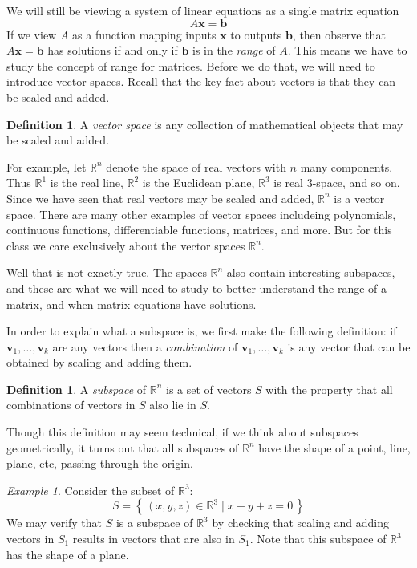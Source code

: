 \documentclass[11pt,oneside]{amsbook}
\newcommand{\set}[1]{\left\{\,#1\,\right\}}
\newcommand{\R}{\mathbb R}
\theoremstyle{definition}
\theoremstyle{plain}
\theoremstyle{definition}
\newtheorem{definition}[theorem]{Definition}
\theoremstyle{remark}
\newtheorem{example}[theorem]{Example}
\numberwithin{equation}{section}
\numberwithin{figure}{section}
\begin{document}
We will still be viewing a system of linear equations as a single matrix equation
\[A\mathbf{x}=\mathbf{b}
\]
If we view $A$ as a function mapping inputs $\mathbf{x}$ to outputs $\mathbf{b}$, then observe that $A\mathbf{x}=\mathbf{b}$ has solutions if and only if $\mathbf{b}$ is in the \emph{range} of $A$. This means we have to study the concept of range for matrices. Before we do that, we will need to introduce vector spaces. Recall that the key fact about vectors is that they can be scaled and added.

\begin{definition}
  A \emph{vector space} is any collection of mathematical objects that may be scaled and added.
\end{definition}

For example, let $\R^n$ denote the space of real vectors with $n$ many components. Thus $\R^1$ is the real line, $\R^2$ is the Euclidean plane, $\R^3$ is real $3$-space, and so on. Since we have seen that real vectors may be scaled and added, $\R^n$ is a vector space. There are many other examples of vector spaces includeing polynomials, continuous functions, differentiable functions, matrices, and more. But for this class we care exclusively about the vector spaces $\R^n$.

Well that is not exactly true. The spaces $\R^n$ also contain interesting subspaces, and these are what we will need to study to better understand the range of a matrix, and when matrix equations have solutions.

In order to explain what a subspace is, we first make the following definition: if $\textbf{v}_1,\ldots,\textbf{v}_k$ are any vectors then a \emph{combination} of $\textbf{v}_1,\ldots,\textbf{v}_k$ is any vector that can be obtained by scaling and adding them.

\begin{definition}
  A \emph{subspace} of $\R^n$ is a set of vectors $S$ with the property that all combinations of vectors in $S$ also lie in $S$.
\end{definition}

Though this definition may seem technical, if we think about subspaces geometrically, it turns out that all subspaces of $\R^n$ have the shape of a point, line, plane, etc, passing through the origin.

\begin{example}
  Consider the subset of $\R^3$:
  \[S=\set{(x,y,z)\in\R^3\mid x+y+z=0}
  \]
  We may verify that $S$ is a subspace of $\R^3$ by checking that scaling and adding vectors in $S_1$ results in vectors that are also in $S_1$. Note that this subspace of $\R^3$ has the shape of a plane.
\end{example}
\end{document}
